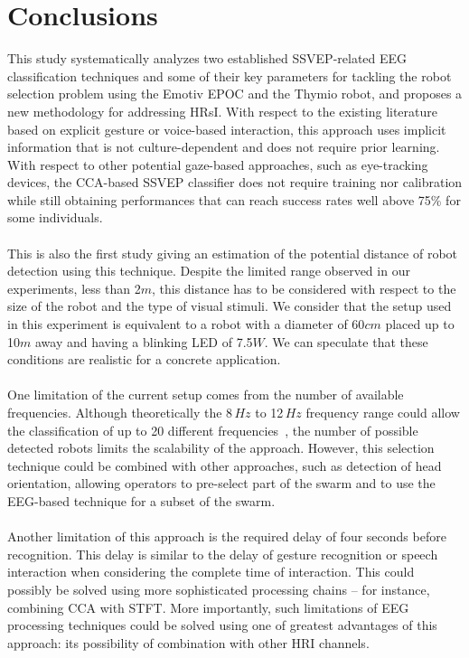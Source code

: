 \documentclass[smallextended]{svjour3}
\begin{document}
\section{Conclusions}
This study systematically analyzes two established SSVEP-related EEG classification techniques and some of their key parameters for tackling the robot selection problem using the Emotiv EPOC and the Thymio robot, and proposes a new methodology for addressing HRsI. 
With respect to the existing literature based on explicit gesture or voice-based interaction, this approach uses implicit information that is not culture-dependent and does not require prior learning. 
With respect to other potential gaze-based approaches, such as eye-tracking devices, the CCA-based SSVEP classifier does not require training nor calibration while still obtaining performances that can reach success rates well above 75\% for some individuals.\\
\\
This is also the first study giving an estimation of the potential distance of robot detection using this technique.
Despite the limited range observed in our experiments, less than 2$m$, this distance has to be considered with respect to the size of the robot and the type of visual stimuli. We consider that the setup used in this experiment is equivalent to a robot with a diameter of 60$cm$ placed up to 10$m$ away and having a blinking LED of 7.5$W$. 
We can speculate that these conditions are realistic for a concrete application.\\
\\
One limitation of the current setup comes from the number of available frequencies.
Although theoretically the 8\,$Hz$ to 12\,$Hz$ frequency range could allow the classification of up to 20 different frequencies~\cite{SSVEPfiability}, the number of possible detected robots limits the scalability of the approach. 
However, this selection technique could be combined with other approaches, such as detection of head orientation, allowing operators to pre-select part of the swarm and to use the EEG-based technique for a subset of the swarm.\\
\\
Another limitation of this approach is the required delay of four seconds before recognition.
This delay is similar to the delay of gesture recognition or speech interaction when considering the complete time of interaction.
This could possibly be solved using more sophisticated processing chains -- for instance, combining CCA with STFT.
More importantly, such limitations of EEG processing techniques could be solved using one of greatest advantages of this approach: its possibility of combination with other HRI channels.
\end{document}
